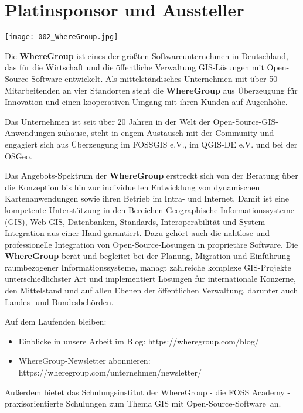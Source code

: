 \section*{Platinsponsor und Aussteller}
\begin{center}
  \centerline{\texttt{[image: 002\_WhereGroup.jpg]}}
\end{center}

\noindent
Die {\bfseries WhereGroup} ist eines der größten Softwareunternehmen in Deutschland, das für die Wirtschaft und die öffentliche Verwaltung GIS-Lösungen mit Open-Source-Software entwickelt. Als mittelständisches Unternehmen mit über 50 Mitarbeitenden an vier Standorten steht die {\bfseries WhereGroup} aus Überzeugung für Innovation und einen kooperativen Umgang mit ihren Kunden auf Augenhöhe.

\noindent
Das Unternehmen ist seit über 20 Jahren in der Welt der Open-Source-GIS-Anwendun\-gen zuhause, steht in engem Austausch mit der Community und engagiert sich aus Überzeugung im FOSSGIS e.V., im QGIS-DE e.V. und bei der OSGeo.

\noindent
Das Angebots-Spektrum der {\bfseries WhereGroup} erstreckt sich von der Beratung über die Konzeption bis hin zur individuellen Entwicklung von dynamischen Kartenanwendungen sowie ihren Betrieb im Intra- und Internet. Damit ist eine kompetente Unterstützung in den Bereichen Geographische Informationssysteme (GIS), Web-GIS, Datenbanken, Standards, Interoperabilität und System-Integration aus einer Hand garantiert. Dazu gehört auch die nahtlose und professionelle Integration von Open-Source-Lösungen in proprietäre Software.
\newpage
\noindent
Die {\bfseries WhereGroup} berät und begleitet bei der Planung, Migration und Einführung raumbezogener Informationssysteme, managt zahlreiche komplexe GIS-Projekte unterschiedlichster Art und implementiert Lösungen für internationale Konzerne, den Mittelstand und auf allen Ebenen der öffentlichen Verwaltung, darunter auch Landes- und Bundesbehörden.

\noindent
Auf dem Laufenden bleiben:

\begin{itemize}
\item Einblicke in unsere Arbeit im Blog: https://wheregroup.com/blog/
\item  WhereGroup-Newsletter abonnieren: https://wheregroup.com/unternehmen/newsletter/
 \end{itemize}

\noindent
Außerdem bietet das Schulungsinstitut der WhereGroup - die FOSS Academy -
praxisorientierte Schulungen zum Thema \glqq GIS mit Open-Source-Software\grqq\  an.
